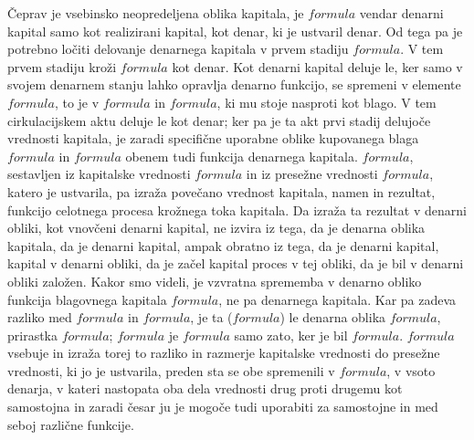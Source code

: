 \documentclass[a5paper]{scrbook}
\begin{document}
Čeprav je vsebinsko neopredeljena oblika kapitala, je \( formula \) vendar denarni kapital samo kot realizirani kapital, kot denar, ki je ustvaril denar. Od tega pa je potrebno ločiti delovanje denarnega kapitala v prvem stadiju \( formula \). V tem prvem stadiju kroži \( formula \) kot denar. Kot denarni kapital deluje le, ker samo v svojem denarnem stanju lahko opravlja denarno funkcijo, se spremeni v elemente \( formula \), to je v \( formula \) in \( formula \), ki mu stoje nasproti kot blago. V tem cirkulacijskem aktu deluje le kot denar; ker pa je ta akt prvi stadij delujoče vrednosti kapitala, je zaradi specifične uporabne oblike kupovanega blaga \( formula \) in \( formula \) obenem tudi funkcija denarnega kapitala. \( formula \), sestavljen iz kapitalske vrednosti \( formula \) in iz presežne vrednosti \( formula \), katero je ustvarila, pa izraža povečano vrednost kapitala, namen in rezultat, funkcijo celotnega procesa krožnega toka kapitala. Da izraža ta rezultat v denarni obliki, kot vnovčeni denarni kapital, ne izvira iz tega, da je denarna oblika kapitala, da je denarni kapital, ampak obratno iz tega, da je denarni kapital, kapital v denarni obliki, da je začel kapital proces v tej obliki, da je bil v denarni obliki založen. Kakor smo videli, je vzvratna sprememba v denarno obliko funkcija blagovnega kapitala \( formula \), ne pa denarnega kapitala. Kar pa zadeva razliko med \( formula \) in \( formula \), je ta (\( formula \)) le denarna oblika \( formula \), prirastka \( formula \); \( formula \) je \( formula \) samo zato, ker je bil \( formula \). \( formula \) vsebuje in izraža torej to razliko in razmerje kapitalske vrednosti do presežne vrednosti, ki jo je ustvarila, preden sta se obe spremenili v \( formula \), v vsoto denarja, v kateri nastopata oba dela vrednosti drug proti drugemu kot samostojna in zaradi česar ju je mogoče tudi uporabiti za samostojne in med seboj različne funkcije.
\end{document}
